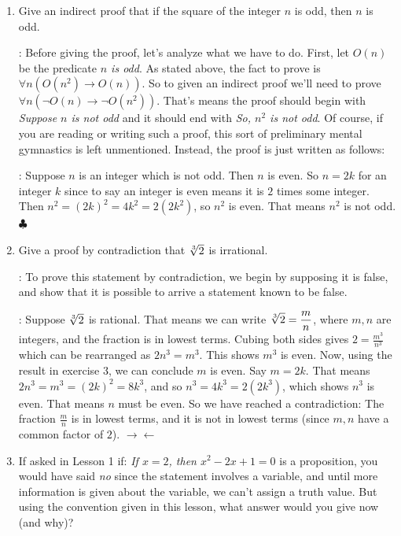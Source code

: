 \documentclass[11pt]{amsart}
\begin{document}
\begin{enumerate}

\item Give an indirect proof that if the square of the integer $n$ is odd, then $n$ is odd.
\vskip 5pt

: Before giving the proof, let's analyze what we have to do. 
First, let $O(n)$ be the predicate
{\it $n$ is odd}. As stated above, the fact to prove is $\forall n (O(n^2)\longrightarrow O(n))$.
So to given an indirect proof we'll need to prove $\forall n (\neg O(n)\longrightarrow \neg O(n^2))$.
That's means the proof should begin with {\it Suppose $n$ is not odd} and it should end with
{\it So, $n^2$ is not odd}. Of course, if you are reading or writing such a proof, this sort of preliminary
mental gymnastics is left unmentioned. Instead, the proof is just written  as follows:

: Suppose $n$ is an integer which is not odd. Then $n$ is even. So $n=2k$
for an integer $k$ since to say an integer is even means it is $2$ times some integer. Then
$n^2 = (2k)^2 = 4k^2 = 2(2k^2)$, so $n^2$ is even. That means $n^2$ is not odd. $\clubsuit$

\medskip


\item Give a proof by contradiction that $\root 3 \of{2}$ is irrational. 
\vskip 5pt

: To prove this statement by contradiction, we begin by supposing 
it is false, and show that  it is possible to arrive a statement known to be false.

: Suppose  $\root 3 \of{2}$ is rational. That means we can write
$\displaystyle \root 3 \of{2} = \frac{m}{n}$, where $m,n$ are integers, and the fraction 
is in lowest terms. Cubing both sides gives $\displaystyle 2 = \frac{m^3}{n^3}$ which
can be rearranged as $2n^3 = m^3$. This shows $m^3$ is even. Now, using the
result in exercise 3, we can conclude $m$ is even. Say $m = 2k$. That means
$2n^3 = m^3 = (2k)^2 = 8k^3$, and so $n^3 = 4k^3 = 2(2k^3)$, which shows
$n^3$ is even. That means $n$ must be even. So we have reached a contradiction:
The fraction $\displaystyle \frac{m}{n}$ is in lowest terms, and it is not in lowest terms (since 
$m,n$ have a common factor of $2$). ${\rightarrow\!\leftarrow}$ 


\medskip

\item If asked in Lesson 1 if:
{\it  If $x=2$, then $x^2-2x+1=0$} is  a proposition, you would have said {\it no}
since the statement involves a variable, and until more information is given about the variable, we can't assign a truth value.
But using the convention given in this lesson, what answer would you give now (and why)?


\end{enumerate}
\end{document}
